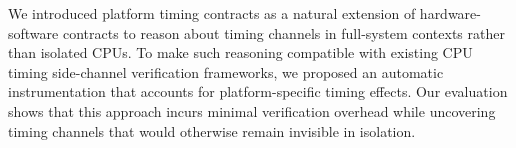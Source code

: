 We introduced platform timing contracts as a natural extension of hardware-software contracts to reason about timing channels in full-system contexts rather than isolated CPUs.
To make such reasoning compatible with existing CPU timing side-channel verification frameworks, we proposed an automatic instrumentation that accounts for platform-specific timing effects.
Our evaluation shows that this approach incurs minimal verification overhead while uncovering timing channels that would otherwise remain invisible in isolation.
